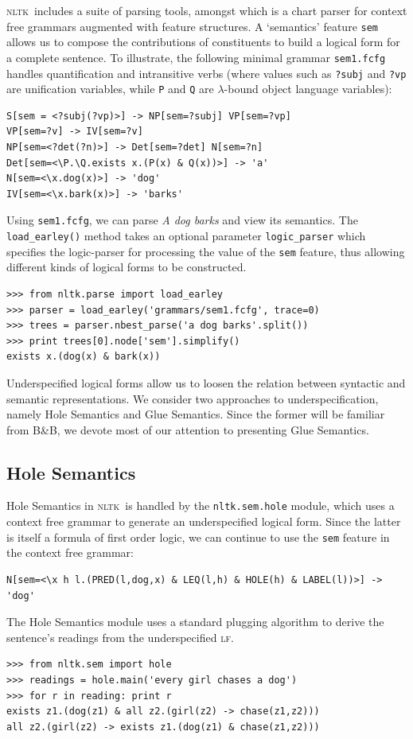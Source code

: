 \documentclass[11pt, a4paper]{article}
\newcommand{\BB}{\textsc{B{\small\&}B}}
\newcommand{\LF}{\textsc{lf}}
\newcommand{\NLTK}{\textsc{nltk}}
\begin{document}
\NLTK\ includes a suite of parsing tools, amongst which is a chart
parser for context free grammars augmented with feature structures. A
`semantics' feature \texttt{sem} allows us to compose the
contributions of constituents to build a logical form for a complete
sentence.  To illustrate, the following minimal grammar
\texttt{sem1.fcfg} handles quantification and intransitive verbs
(where values such as \texttt{?subj} and \texttt{?vp} are unification
variables, while \texttt{P} and \texttt{Q} are $\lambda$-bound object
language variables):
\begin{Verbatim}
S[sem = <?subj(?vp)>] -> NP[sem=?subj] VP[sem=?vp]
VP[sem=?v] -> IV[sem=?v]
NP[sem=<?det(?n)>] -> Det[sem=?det] N[sem=?n]
Det[sem=<\P.\Q.exists x.(P(x) & Q(x))>] -> 'a'
N[sem=<\x.dog(x)>] -> 'dog'
IV[sem=<\x.bark(x)>] -> 'barks'
\end{Verbatim}
Using \texttt{sem1.fcfg}, we can parse \textit{A dog barks} and view
its semantics. 
The \texttt{load\_earley()} method
takes an optional parameter \texttt{logic\_parser} which specifies the
logic-parser for processing the value of the \texttt{sem} feature, thus
allowing different kinds of logical forms to be constructed.
\begin{Verbatim}
>>> from nltk.parse import load_earley
>>> parser = load_earley('grammars/sem1.fcfg', trace=0)
>>> trees = parser.nbest_parse('a dog barks'.split())
>>> print trees[0].node['sem'].simplify()
exists x.(dog(x) & bark(x))
\end{Verbatim}

Underspecified logical forms allow us to loosen the relation between
syntactic and semantic representations. We consider two approaches to
underspecification, namely Hole
Semantics and Glue Semantics. Since the former will be familiar from 
\BB, we devote most of our attention to presenting Glue
Semantics.

\subsection{Hole Semantics}

Hole Semantics in \NLTK\ is handled by the
\texttt{nltk.sem.hole} module, which uses a context free grammar to
generate an underspecified logical form.  Since the latter is itself a
formula of first order logic, we can continue to use the \texttt{sem} feature
in the context free grammar:
\begin{Verbatim}[frame=none,fontsize=\small]
N[sem=<\x h l.(PRED(l,dog,x) & LEQ(l,h) & HOLE(h) & LABEL(l))>] -> 'dog'
\end{Verbatim}
The Hole Semantics module uses a standard plugging algorithm to derive the
sentence's readings from the underspecified \LF.
\begin{Verbatim}
>>> from nltk.sem import hole
>>> readings = hole.main('every girl chases a dog')
>>> for r in reading: print r
exists z1.(dog(z1) & all z2.(girl(z2) -> chase(z1,z2)))
all z2.(girl(z2) -> exists z1.(dog(z1) & chase(z1,z2)))
\end{Verbatim}
\end{document}
